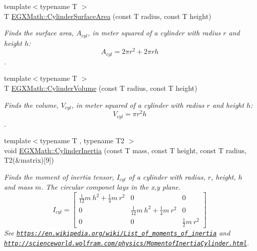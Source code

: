 \begin{DoxyCompactItemize}
\item 
{\footnotesize template$<$typename T $>$ }\\T \mbox{\hyperlink{group___e_g_x_math-_geometry-_cylinder_gaf14619f5d525e14150a43b9898adb258}{E\+G\+X\+Math\+::\+Cylinder\+Surface\+Area}} (const T radius, const T height)
\begin{DoxyCompactList}\small\item\em Finds the surface area, $A_{cyl}$, in meter squared of a cylinder with radius $r$ and height $h$\+: \[ A_{cyl}=2\pi r^2 + 2\pi r h \]. \end{DoxyCompactList}\item 
{\footnotesize template$<$typename T $>$ }\\T \mbox{\hyperlink{group___e_g_x_math-_geometry-_cylinder_ga9d1aa08f778f9ccbd79953063f11bc9b}{E\+G\+X\+Math\+::\+Cylinder\+Volume}} (const T radius, const T height)
\begin{DoxyCompactList}\small\item\em Finds the volume, $V_{cyl}$, in meter squared of a cylinder with radius $r$ and height $h$\+: \[ V_{cyl}=\pi r^2 h\]. \end{DoxyCompactList}\item 
{\footnotesize template$<$typename T , typename T2 $>$ }\\void \mbox{\hyperlink{group___e_g_x_math-_geometry-_cylinder_gae7dca080058b400feb0d69f78af7a850}{E\+G\+X\+Math\+::\+Cylinder\+Inertia}} (const T mass, const T height, const T radius, T2(\&matrix)\mbox{[}9\mbox{]})
\begin{DoxyCompactList}\small\item\em Finds the moment of inertia tensor, $I_{cyl}$ of a cylinder with radius, $r$, height, $h$ and mass $m$. The circular componet lays in the x,y plane. \[ I_{cyl}=\begin{bmatrix} \frac{1}{12}m\ h^2 + \frac{1}{4}m\ r^2 & 0 & 0\\ 0 & \frac{1}{12}m\ h^2 + \frac{1}{4}m\ r^2 & 0\\ 0 & 0 & \frac{1}{2}m\ r^2 \end{bmatrix} \] See \href{https://en.wikipedia.org/wiki/List_of_moments_of_inertia}{\tt https\+://en.\+wikipedia.\+org/wiki/\+List\+\_\+of\+\_\+moments\+\_\+of\+\_\+inertia} and \href{http://scienceworld.wolfram.com/physics/MomentofInertiaCylinder.html}{\tt http\+://scienceworld.\+wolfram.\+com/physics/\+Momentof\+Inertia\+Cylinder.\+html}. \end{DoxyCompactList}\item 

\end{DoxyCompactItemize}
